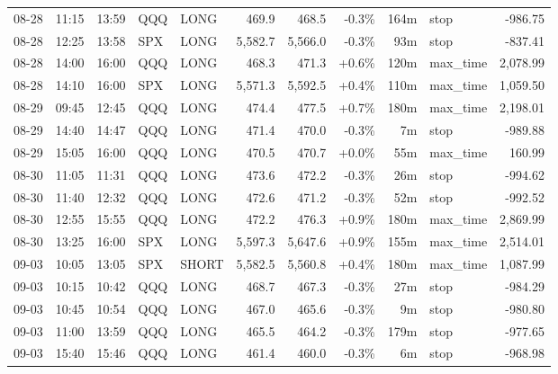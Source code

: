 \documentclass[11pt,a4paper,twoside]{article}
\begin{document}
\begin{center}
\begin{longtable}{>{\color{txtmain}}l l l l l r r r r >{\color{txtmain}}l r}
08-28 & 11:15 & 13:59 & QQQ & LONG & 469.9 & 468.5 & \textcolor{lossred}{-0.3\%} & 164m & stop & \textcolor{lossred}{-986.75} \\
08-28 & 12:25 & 13:58 & SPX & LONG & 5,582.7 & 5,566.0 & \textcolor{lossred}{-0.3\%} & 93m & stop & \textcolor{lossred}{-837.41} \\
08-28 & 14:00 & 16:00 & QQQ & LONG & 468.3 & 471.3 & \textcolor{wingreen}{+0.6\%} & 120m & max\_time & \textcolor{wingreen}{2,078.99} \\
08-28 & 14:10 & 16:00 & SPX & LONG & 5,571.3 & 5,592.5 & \textcolor{wingreen}{+0.4\%} & 110m & max\_time & \textcolor{wingreen}{1,059.50} \\
08-29 & 09:45 & 12:45 & QQQ & LONG & 474.4 & 477.5 & \textcolor{wingreen}{+0.7\%} & 180m & max\_time & \textcolor{wingreen}{2,198.01} \\
08-29 & 14:40 & 14:47 & QQQ & LONG & 471.4 & 470.0 & \textcolor{lossred}{-0.3\%} & 7m & stop & \textcolor{lossred}{-989.88} \\
08-29 & 15:05 & 16:00 & QQQ & LONG & 470.5 & 470.7 & \textcolor{wingreen}{+0.0\%} & 55m & max\_time & \textcolor{wingreen}{160.99} \\
08-30 & 11:05 & 11:31 & QQQ & LONG & 473.6 & 472.2 & \textcolor{lossred}{-0.3\%} & 26m & stop & \textcolor{lossred}{-994.62} \\
08-30 & 11:40 & 12:32 & QQQ & LONG & 472.6 & 471.2 & \textcolor{lossred}{-0.3\%} & 52m & stop & \textcolor{lossred}{-992.52} \\
08-30 & 12:55 & 15:55 & QQQ & LONG & 472.2 & 476.3 & \textcolor{wingreen}{+0.9\%} & 180m & max\_time & \textcolor{wingreen}{2,869.99} \\
08-30 & 13:25 & 16:00 & SPX & LONG & 5,597.3 & 5,647.6 & \textcolor{wingreen}{+0.9\%} & 155m & max\_time & \textcolor{wingreen}{2,514.01} \\
09-03 & 10:05 & 13:05 & SPX & SHORT & 5,582.5 & 5,560.8 & \textcolor{wingreen}{+0.4\%} & 180m & max\_time & \textcolor{wingreen}{1,087.99} \\
09-03 & 10:15 & 10:42 & QQQ & LONG & 468.7 & 467.3 & \textcolor{lossred}{-0.3\%} & 27m & stop & \textcolor{lossred}{-984.29} \\
09-03 & 10:45 & 10:54 & QQQ & LONG & 467.0 & 465.6 & \textcolor{lossred}{-0.3\%} & 9m & stop & \textcolor{lossred}{-980.80} \\
09-03 & 11:00 & 13:59 & QQQ & LONG & 465.5 & 464.2 & \textcolor{lossred}{-0.3\%} & 179m & stop & \textcolor{lossred}{-977.65} \\
09-03 & 15:40 & 15:46 & QQQ & LONG & 461.4 & 460.0 & \textcolor{lossred}{-0.3\%} & 6m & stop & \textcolor{lossred}{-968.98} \\

\end{longtable}
\end{center}
\end{document}
